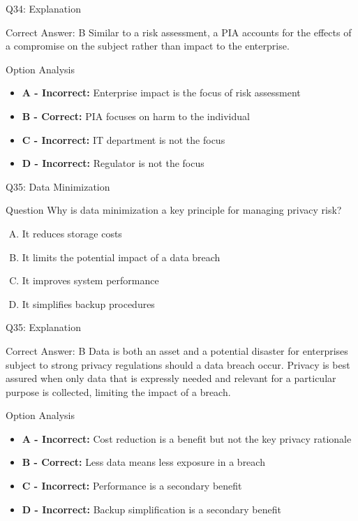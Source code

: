 \documentclass{beamer}
\begin{document}
	\begin{frame}{Q34: Explanation}
		\begin{block}{Correct Answer: B}
			Similar to a risk assessment, a PIA accounts for the effects of a compromise on the subject rather than impact to the enterprise.
		\end{block}
		\begin{block}{Option Analysis}
			\begin{itemize}
				\item \textbf{A - Incorrect:} Enterprise impact is the focus of risk assessment
				\item \textbf{B - Correct:} PIA focuses on harm to the individual
				\item \textbf{C - Incorrect:} IT department is not the focus
				\item \textbf{D - Incorrect:} Regulator is not the focus
			\end{itemize}
		\end{block}
	\end{frame}
	
	\begin{frame}{Q35: Data Minimization}
		\begin{block}{Question}
			Why is data minimization a key principle for managing privacy risk?
		\end{block}
		\begin{enumerate}[(A)]
			\item It reduces storage costs
			\item It limits the potential impact of a data breach
			\item It improves system performance
			\item It simplifies backup procedures
		\end{enumerate}
	\end{frame}
	
	\begin{frame}{Q35: Explanation}
		\begin{block}{Correct Answer: B}
			Data is both an asset and a potential disaster for enterprises subject to strong privacy regulations should a data breach occur. Privacy is best assured when only data that is expressly needed and relevant for a particular purpose is collected, limiting the impact of a breach.
		\end{block}
		\begin{block}{Option Analysis}
			\begin{itemize}
				\item \textbf{A - Incorrect:} Cost reduction is a benefit but not the key privacy rationale
				\item \textbf{B - Correct:} Less data means less exposure in a breach
				\item \textbf{C - Incorrect:} Performance is a secondary benefit
				\item \textbf{D - Incorrect:} Backup simplification is a secondary benefit
			\end{itemize}
		\end{block}
	\end{frame}
	
\end{document}
